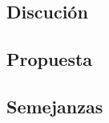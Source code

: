 \documentclass[journal]{IEEEtran}
\begin{document}
\subsection{Discución}
\subsection{Propuesta}
\subsection{Semejanzas}






\balance






\end{document}
